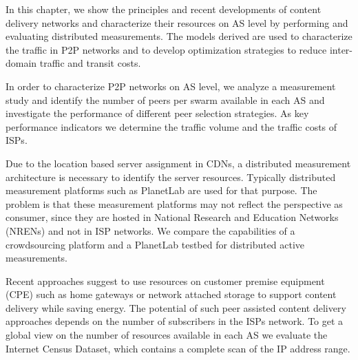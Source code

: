 
In this chapter, we show the principles and recent developments of content delivery networks and characterize their resources on AS level by performing and evaluating distributed measurements.
The models derived are used to characterize the traffic in P2P networks and to develop optimization strategies to reduce inter-domain traffic and transit costs.


In order to characterize P2P networks on AS level,
we analyze a measurement study and identify the number of peers per swarm available in each AS and investigate the performance of different peer selection strategies.
As key performance indicators we determine the traffic volume and the traffic costs of ISPs.

Due to the location based server assignment in CDNs, a distributed measurement architecture is necessary to identify the server resources.
Typically distributed measurement platforms such as PlanetLab are used for that purpose.
The problem is that these measurement platforms may not reflect the perspective as consumer, since they are hosted in National Research and Education Networks (NRENs) and not in ISP networks.
We compare the capabilities of a crowdsourcing platform and a PlanetLab testbed for distributed active measurements.

Recent approaches \cite{valancius2009greening} suggest to use resources on customer premise equipment (CPE) such as home gateways or network attached storage to support content delivery while saving energy.
The potential of such peer assisted content delivery approaches depends on the number of subscribers in the ISPs network.
To get a global view on the number of resources available in each AS we evaluate the Internet Census Dataset, which contains a complete scan of the IP address range.

